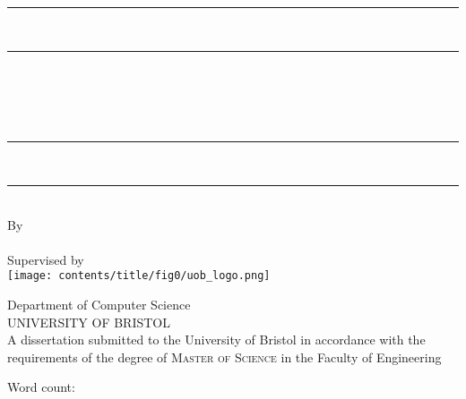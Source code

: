 \begin{titlepage}
    \centering

    \vspace*{2.2cm}

    \rule{\textwidth}{2pt} \\[-2ex]
    \rule{\textwidth}{0.5pt} \\[0.7cm]

    {\LARGE\bfseries \myReportTitle} \\[0.3cm]

    \parbox{0.89\textwidth}{\centering
        {\large \textit{\myReportSubtitle}}
    } \\[0.3cm]

    \rule{\textwidth}{0.5pt} \\[-2ex]
    \rule{\textwidth}{2pt} \\[0.3cm]

    {\large By} \\[0.3cm]
    {\large \myName} \\[0.3cm]
    {\normalsize Supervised by \mySupervisor} \\[1cm]

    \texttt{[image: contents/title/fig0/uob\_logo.png]} \\[1cm]

    \begin{minipage}{0.65\textwidth}
        \centering
        {\Large Department of Computer Science} \\[0.3cm]
        {\Large \textsc{UNIVERSITY OF BRISTOL}} \\[1cm]
        {\normalsize A dissertation submitted to the University of Bristol
        in accordance with the requirements of the degree of \textsc{Master of Science}
        in the Faculty of Engineering} \\[1cm]
        {\large \mySubmissionMonthYear}
    \end{minipage}

    \vspace*{1cm}


    \begin{flushright}
        Word count: \wordCount
    \end{flushright}

    \vspace*{2.2cm}

\end{titlepage}